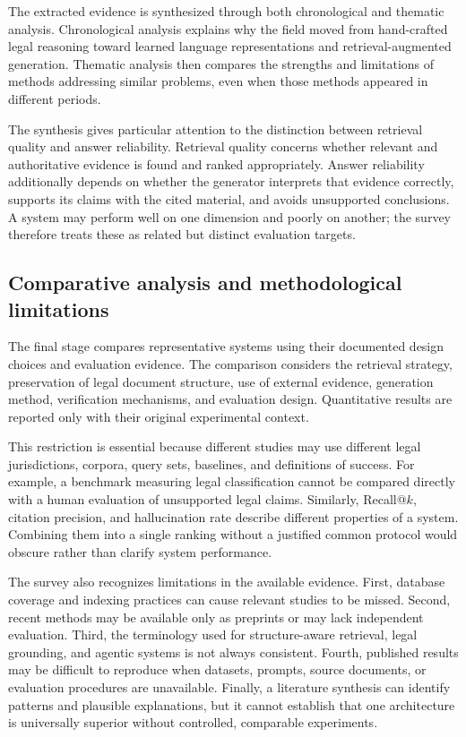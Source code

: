 The extracted evidence is synthesized through both chronological and thematic analysis.
Chronological analysis explains why the field moved from hand-crafted legal reasoning toward
learned language representations and retrieval-augmented generation. Thematic analysis then
compares the strengths and limitations of methods addressing similar problems, even when those
methods appeared in different periods.

The synthesis gives particular attention to the distinction between retrieval quality and answer
reliability. Retrieval quality concerns whether relevant and authoritative evidence is found and
ranked appropriately. Answer reliability additionally depends on whether the generator interprets
that evidence correctly, supports its claims with the cited material, and avoids unsupported
conclusions. A system may perform well on one dimension and poorly on another; the survey
therefore treats these as related but distinct evaluation targets.

\subsection{Comparative analysis and methodological limitations}

The final stage compares representative systems using their documented design choices and
evaluation evidence. The comparison considers the retrieval strategy, preservation of legal
document structure, use of external evidence, generation method, verification mechanisms, and
evaluation design. Quantitative results are reported only with their original experimental context.

This restriction is essential because different studies may use different legal jurisdictions,
corpora, query sets, baselines, and definitions of success. For example, a benchmark measuring
legal classification cannot be compared directly with a human evaluation of unsupported legal
claims. Similarly, Recall@$k$, citation precision, and hallucination rate describe different
properties of a system. Combining them into a single ranking without a justified common protocol
would obscure rather than clarify system performance.

The survey also recognizes limitations in the available evidence. First, database coverage and
indexing practices can cause relevant studies to be missed. Second, recent methods may be available
only as preprints or may lack independent evaluation. Third, the terminology used for
structure-aware retrieval, legal grounding, and agentic systems is not always consistent. Fourth,
published results may be difficult to reproduce when datasets, prompts, source documents, or
evaluation procedures are unavailable. Finally, a literature synthesis can identify patterns and
plausible explanations, but it cannot establish that one architecture is universally superior
without controlled, comparable experiments.

